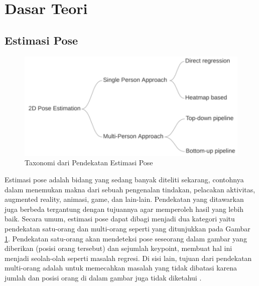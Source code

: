 \section{Dasar Teori}
\label{sec:dasar-teori}

\subsection{Estimasi Pose}
\label{subsec:estimasi-pose}

\begin{figure}[ht]
  \centering

  \includegraphics[scale=1]{gambar/taxonomy-pose-estimation.png}

  \caption{Taxonomi dari Pendekatan Estimasi Pose}
  \label{fig:pose-estimation}
\end{figure}

Estimasi pose adalah bidang yang sedang banyak diteliti sekarang, contohnya dalam menemukan makna dari sebuah pengenalan tindakan, pelacakan aktivitas, augmented reality, animasi, game, dan lain-lain.
Pendekatan yang ditawarkan juga berbeda tergantung dengan tujuannya agar memperoleh hasil yang lebih baik. Secara umum, estimasi pose dapat dibagi
menjadi dua kategori yaitu pendekatan satu-orang dan multi-orang seperti yang ditunjukkan
pada Gambar \ref{fig:pose-estimation}. Pendekatan satu-orang akan mendeteksi pose seseorang dalam gambar yang
diberikan (posisi orang tersebut) dan sejumlah keypoint, membuat hal ini menjadi seolah-olah
seperti masalah regresi. Di sisi lain, tujuan dari pendekatan multi-orang adalah untuk memecahkan masalah yang tidak dibatasi karena jumlah dan posisi orang di dalam gambar juga tidak
diketahui \parencite{romeo}.

